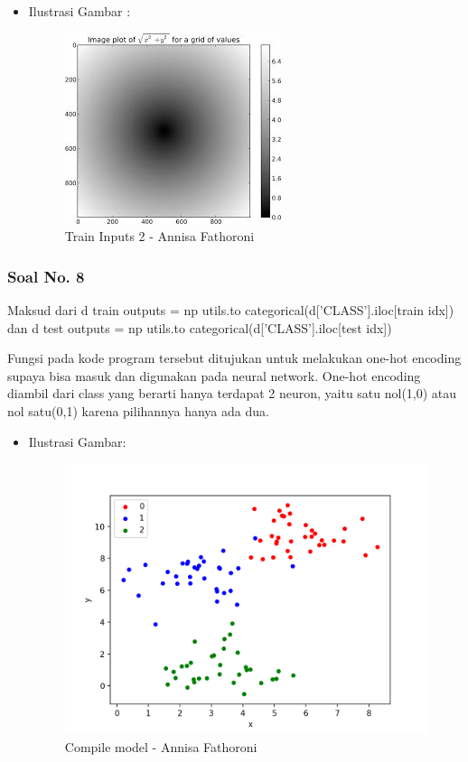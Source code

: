 \begin{itemize}
\item Ilustrasi Gambar :

\begin{figure}[!hbtp]
\centering
\includegraphics[scale=0.4]{figures/Chapter 7/1164067/Teori/Chapter7AnnisaFathoroni7.png}
\caption{Train Inputs 2 - Annisa Fathoroni}
\label{Train Inputs 2 - Annisa Fathoroni}
\end{figure}

\end{itemize}

\subsubsection{Soal No. 8}
 Maksud dari  d train outputs = np utils.to categorical(d[’CLASS’].iloc[train idx]) dan d test outputs = np utils.to categorical(d[’CLASS’].iloc[test idx])

Fungsi pada kode program tersebut ditujukan untuk melakukan one-hot encoding supaya bisa masuk dan digunakan pada neural network. One-hot encoding diambil dari class yang berarti hanya terdapat 2 neuron, yaitu satu nol(1,0) atau nol satu(0,1) karena pilihannya hanya ada dua.

\begin{itemize}
\item Ilustrasi Gambar:

\begin{figure}[!hbtp]
\centering
\includegraphics[scale=0.4]{figures/Chapter 7/1164067/Teori/Chapter7AnnisaFathoroni8.png}
\caption{Compile model - Annisa Fathoroni}
\label{Compile model - Annisa Fathoroni}
\end{figure}

\end{itemize}

